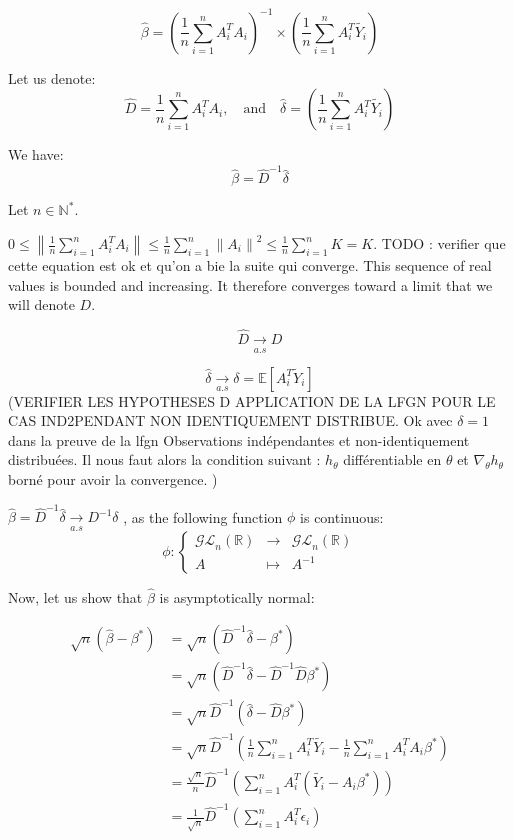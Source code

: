 \[
\hat {\beta } = \left( \frac{1}{n} \sum_{i=1}^{n}   A_i ^T A_i \right) ^{-1}    \times \left( \frac{1}{n} \sum_{i=1}^{n} A_i ^T \tilde{Y_i } \right)
\]

Let us denote:
\[
\hat{D}  = \frac{1}{n} \sum_{i=1}^{n}   A_i ^T A_i , \quad \text{and} \quad \hat{\delta}  = \left( \frac{1}{n} \sum_{i=1}^{n} A_i ^T \tilde{Y_i } \right)
\]

We have:
\[
\hat{\beta} = \hat{D} ^{-1} \hat{\delta}
\]


Let $n \in \mathbb{N}^*$. 

$0 \leq \left\lVert\frac{1}{n} \sum_{i=1}^{n} A_i^T A_i\right\rVert \leq \frac{1}{n} \sum_{i=1}^{n} \left\lVert A_i\right\rVert ^2 \leq \frac{1}{n} \sum_{i=1}^{n} K = K $. 
TODO  : verifier que cette equation est ok et qu'on a bie la suite qui converge. 
This sequence of real values is bounded and increasing. It therefore converges toward a limit that we will denote $D$.

\[
\hat{D}  \underset{a.s}{\rightarrow} D
\] 


\[ 
\hat{\delta}   \underset{a.s}{\rightarrow}  \delta = \mathbb{E}[A_i ^T \tilde{Y}_i ]
\] (VERIFIER LES HYPOTHESES D APPLICATION DE LA LFGN POUR LE CAS IND2PENDANT NON IDENTIQUEMENT DISTRIBUE. Ok avec $\delta=1$ dans la preuve de la lfgn Observations indépendantes et non-identiquement distribuées. Il nous faut alors la condition suivant : $h_\theta$ différentiable en $\theta$ et $\nabla_\theta h_\theta$ borné pour avoir la convergence.  )

$ \hat{\beta} = \hat{D}^{-1} \hat{\delta}  \underset{a.s}{\rightarrow}  D^{-1} \delta $ , as the following function $\phi$ is continuous:
\[
\phi: \left\{
\begin{array}{rcl}
\mathcal{GL}_n(\mathbb{R}) & \to & \mathcal{GL}_n(\mathbb{R}) \\
A & \mapsto & A^{-1}
\end{array}
\right.
\]


Now, let us show that $\hat{\beta}$ is asymptotically normal: 

\begin{align*}
    \sqrt{n} ( \hat{\beta} - \beta ^* ) &= \sqrt{n} (\hat{D}^{-1} \hat{\delta} - \beta ^* ) \\
     &= \sqrt{n} (\hat{D}^{-1} \hat{\delta} - \hat{D}^{-1} \hat{D} \beta ^* ) \\
     &= \sqrt{n} \hat{D}^{-1} (\hat{\delta} -  \hat{D} \beta ^* )  \\
     &= \sqrt{n} \hat{D}^{-1} \left( \frac{1}{n} \sum_{i=1}^{n} A_i ^T \tilde{Y_i} - \frac{1}{n}  \sum_{i=1}^{n}  A_i ^T A_i \beta ^* \right)  \\
     &= \frac{\sqrt{n}}{n} \hat{D}^{-1} \left( \sum_{i=1}^{n} A_i ^T (\tilde{Y_i} -    A_i \beta ^* ) \right)   \\
     &= \frac{1}{\sqrt{n}}  \hat{D} ^{-1} \left( \sum_{i=1}^{n}  A_i ^T \epsilon _ i \right)  
\end{align*}

